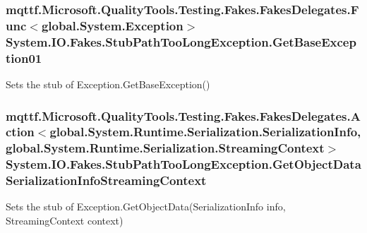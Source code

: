 \hypertarget{class_system_1_1_i_o_1_1_fakes_1_1_stub_path_too_long_exception_a54757807333fb1bc2779a64d2cdcb2c0}{
\subsubsection[{Get\-Base\-Exception01}]{\setlength{\rightskip}{0pt plus 5cm}mqttf.\-Microsoft.\-Quality\-Tools.\-Testing.\-Fakes.\-Fakes\-Delegates.\-Func$<$global.\-System.\-Exception$>$ System.\-I\-O.\-Fakes.\-Stub\-Path\-Too\-Long\-Exception.\-Get\-Base\-Exception01}}\label{class_system_1_1_i_o_1_1_fakes_1_1_stub_path_too_long_exception_a54757807333fb1bc2779a64d2cdcb2c0}


Sets the stub of Exception.\-Get\-Base\-Exception()

\hypertarget{class_system_1_1_i_o_1_1_fakes_1_1_stub_path_too_long_exception_a232ae8eeff1d3fe723db8b216d9c313a}{
\subsubsection[{Get\-Object\-Data\-Serialization\-Info\-Streaming\-Context}]{\setlength{\rightskip}{0pt plus 5cm}mqttf.\-Microsoft.\-Quality\-Tools.\-Testing.\-Fakes.\-Fakes\-Delegates.\-Action$<$global.\-System.\-Runtime.\-Serialization.\-Serialization\-Info, global.\-System.\-Runtime.\-Serialization.\-Streaming\-Context$>$ System.\-I\-O.\-Fakes.\-Stub\-Path\-Too\-Long\-Exception.\-Get\-Object\-Data\-Serialization\-Info\-Streaming\-Context}}\label{class_system_1_1_i_o_1_1_fakes_1_1_stub_path_too_long_exception_a232ae8eeff1d3fe723db8b216d9c313a}


Sets the stub of Exception.\-Get\-Object\-Data(\-Serialization\-Info info, Streaming\-Context context)

